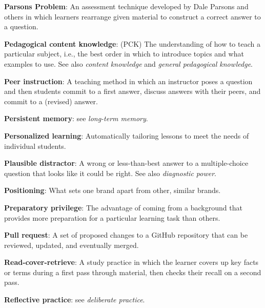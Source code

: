 \textbf{\hypertarget{g:parsons-problem}{Parsons Problem}\label{g:parsons-problem}}: An assessment technique
developed by Dale Parsons and others in which learners rearrange given
material to construct a correct answer to a question.

\textbf{\hypertarget{g:pedagogical-content-knowledge}{Pedagogical content knowledge}\label{g:pedagogical-content-knowledge}}:
(PCK) The understanding of how to teach a particular subject, i.e., the
best order in which to introduce topics and what examples to use. See
also \emph{content knowledge} and \emph{general pedagogical knowledge}.

\textbf{\hypertarget{g:peer-instruction}{Peer instruction}\label{g:peer-instruction}}: A teaching method in
which an instructor poses a question and then students commit to a first
answer, discuss answers with their peers, and commit to a (revised)
answer.

\textbf{\hypertarget{g:persistent-memory}{Persistent memory}\label{g:persistent-memory}}: see \emph{long-term
memory}.

\textbf{\hypertarget{g:personalized-learning}{Personalized learning}\label{g:personalized-learning}}:
Automatically tailoring lessons to meet the needs of individual
students.

\textbf{\hypertarget{g:plausible-distractor}{Plausible distractor}\label{g:plausible-distractor}}: A wrong or
less-than-best answer to a multiple-choice question that looks like it
could be right. See also \emph{diagnostic power}.

\textbf{\hypertarget{g:positioning}{Positioning}\label{g:positioning}}: What sets one brand apart from
other, similar brands.

\textbf{\hypertarget{g:preparatory-privilege}{Preparatory privilege}\label{g:preparatory-privilege}}: The
advantage of coming from a background that provides more preparation for
a particular learning task than others.

\textbf{\hypertarget{g:pull-request}{Pull request}\label{g:pull-request}}: A set of proposed changes to
a GitHub repository that can be reviewed, updated, and eventually
merged.

\textbf{\hypertarget{g:read-cover-retrieve}{Read-cover-retrieve}\label{g:read-cover-retrieve}}: A study
practice in which the learner covers up key facts or terms during a
first pass through material, then checks their recall on a second pass.

\textbf{\hypertarget{g:reflective-practice}{Reflective practice}\label{g:reflective-practice}}: see \emph{deliberate
practice}.

